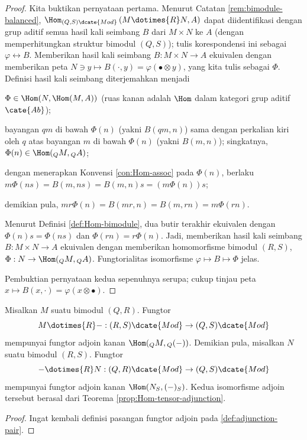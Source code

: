 \begin{proof}
	Kita buktikan pernyataan pertama. Menurut Catatan \ref{rem:bimodule-balanced}, $\Hom_{(Q,S)\dcate{Mod}} \allowbreak \left( M \dotimes{R} N, A \right)$ dapat diidentifikasi dengan grup aditif semua hasil kali seimbang $B$ dari $M \times N$ ke $A$ (dengan memperhitungkan struktur bimodul $(Q, S)$); tulis korespondensi ini sebagai $\varphi \leftrightarrow B$. Memberikan hasil kali seimbang $B: M \times N \to A$ ekuivalen dengan memberikan peta $N \ni y \mapsto B(\cdot, y) = \varphi(\bullet \otimes y)$, yang kita tulis sebagai $\Phi$. Definisi hasil kali seimbang diterjemahkan menjadi
	\begin{compactitem}
		\item $\Phi \in \Hom(N, \Hom(M, A))$ (ruas kanan adalah $\Hom$ dalam kategori grup aditif $\cate{Ab}$);
		\item bayangan $qm$ di bawah $\Phi(n)$ (yakni $B(qm, n)$) sama dengan perkalian kiri oleh $q$ atas bayangan $m$ di bawah $\Phi(n)$ (yakni $B(m, n)$); singkatnya, $\Phi(n) \in \Hom({}_Q M, {}_Q A)$;
		\item dengan menerapkan Konvensi \ref{con:Hom-assoc} pada $\Phi(n)$, berlaku $ m \Phi(ns) = B(m, ns) = B(m, n)s = (m\Phi(n))s$;
		\item demikian pula, $mr \Phi(n) = B(mr, n) = B(m, rn) = m\Phi(rn)$.
	\end{compactitem}

	Menurut Definisi \ref{def:Hom-bimodule}, dua butir terakhir ekuivalen dengan $\Phi(n)s = \Phi(ns)$ dan $\Phi(rn) = r\Phi(n)$. Jadi, memberikan hasil kali seimbang $B: M \times N \to A$ ekuivalen dengan memberikan homomorfisme bimodul $(R,S)$, $\Phi: N \to \Hom({}_Q M, {}_Q A)$. Fungtorialitas isomorfisme $\varphi \mapsto B \mapsto \Phi$ jelas.

	Pembuktian pernyataan kedua sepenuhnya serupa; cukup tinjau peta $x \mapsto B(x, \cdot) = \varphi(x \otimes \bullet)$.
\end{proof}

\begin{corollary}
	Misalkan $M$ suatu bimodul $(Q, R)$. Fungtor
	\[ M \dotimes{R} -: (R, S)\dcate{Mod} \to (Q, S)\dcate{Mod} \]
	mempunyai fungtor adjoin kanan $\Hom({}_Q M, {}_Q (-))$. Demikian pula, misalkan $N$ suatu bimodul $(R, S)$. Fungtor
	\[ - \dotimes{R} N: (Q, R)\dcate{Mod} \to (Q, S)\dcate{Mod} \]
	mempunyai fungtor adjoin kanan $\Hom(N_S, (-)_S)$. Kedua isomorfisme adjoin tersebut berasal dari Teorema \ref{prop:Hom-tensor-adjunction}.
\end{corollary}
\begin{proof}
	Ingat kembali definisi pasangan fungtor adjoin pada \ref{def:adjunction-pair}.
\end{proof}

